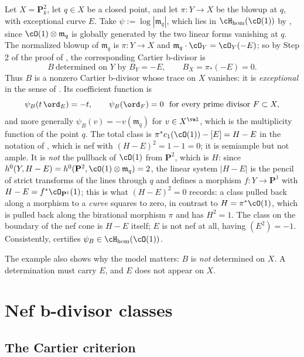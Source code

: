 \begin{example}
\label{ex:ch35-blowup-bdivisor}
Let $X=\mathbf P^2_k$, let $q\in X$ be a closed point, and let
$\pi:Y\to X$ be the blowup at $q$, with exceptional curve $E$.  Take
$\psi:=\log|\mathfrak m_q|$, which lies in
$\cH_{\mathrm{hom}}(\cO(1))$ by , since
$\cO(1)\otimes\mathfrak m_q$ is globally generated by the two linear forms
vanishing at $q$.  The normalized blowup of $\mathfrak m_q$ is
$\pi:Y\to X$ and $\mathfrak m_q\cdot\cO_Y=\cO_Y(-E)$; so by Step 2 of
the proof of , the corresponding Cartier
b-divisor is
\[
 B\ \text{determined on }Y\text{ by }B_Y=-E,
 \qquad B_X=\pi_*(-E)=0 .
\]
Thus $B$ is a nonzero Cartier b-divisor whose trace on $X$ vanishes: it
is \emph{exceptional} in the sense of
.  Its coefficient function is
\[
 \psi_B(t\,\ord_E)=-t,
 \qquad
 \psi_B(\ord_F)=0\ \text{ for every prime divisor }F\subset X,
\]
and more generally $\psi_B(v)=-v(\mathfrak m_q)$ for
$v\in X^{\val}$, which is the multiplicity function of the point $q$.
The total class is
$\pi^*c_1(\cO(1))-[E]=H-E$ in the notation of
, which is nef with
$(H-E)^2=1-1=0$; it is semiample but not ample.  It is \emph{not} the
pullback of $\cO(1)$ from $\mathbf P^2$, which is $H$: since
$h^0(Y,H-E)=h^0(\mathbf P^2,\cO(1)\otimes\mathfrak m_q)=2$, the linear
system $|H-E|$ is the pencil of strict transforms of the lines through
$q$ and defines a morphism $f:Y\to\mathbf P^1$ with
$H-E=f^*\cO_{\mathbf P^1}(1)$; this is what
$(H-E)^2=0$ records: a class pulled back along a morphism to a \emph{curve}
squares to zero, in contrast to $H=\pi^*\cO(1)$, which is pulled back along
the birational morphism $\pi$ and has $H^2=1$.  The class on the boundary of the nef cone
is $H-E$ itself; $E$ is not nef at all, having $(E^2)=-1$.  Consistently,
 certifies
$\psi_B\in\cH_{\mathrm{hom}}(\cO(1))$.

The example also shows why the model matters: $B$ is \emph{not} determined
on $X$.  A determination must carry $E$, and $E$ does not appear on
$X$.
\end{example}

\section{Nef b-divisor classes}
\label{sec:ch35-nef-bclasses}

\subsection{The Cartier criterion}
\label{sec:ch35-cartier-criterion}

